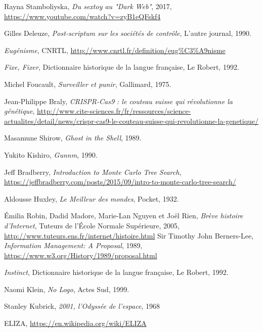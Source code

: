 \begin{thebibliography}{99}
     Rayna Stamboliyska, \emph{Du sextoy au "Dark Web"}, 2017, \url{https://www.youtube.com/watch?v=zyB1eQFskf4}

     Gilles Deleuze, \emph{Post-scriptum sur les sociétés de contrôle}, L'autre journal, 1990.

     \emph{Eugénisme}, CNRTL, \url{http://www.cnrtl.fr/definition/eug%C3%A9nisme}

     \emph{Fixe, Fixer}, Dictionnaire historique de la langue française, Le Robert, 1992. 

     Michel Foucault, \emph{Surveiller et punir}, Gallimard, 1975.

     Jean-Philippe Braly, \emph{CRISPR-Cas9 : le couteau suisse qui révolutionne la génétique}, \url{http://www.cite-sciences.fr/fr/ressources/science-actualites/detail/news/crispr-cas9-le-couteau-suisse-qui-revolutionne-la-genetique/}

     Masamune Shirow, \emph{Ghost in the Shell}, 1989.

     Yukito Kishiro, \emph{Gunnm}, 1990.

     Jeff Bradberry, \emph{Introduction to Monte Carlo Tree Search}, \url{https://jeffbradberry.com/posts/2015/09/intro-to-monte-carlo-tree-search/}

     Aldousse Huxley, \emph{Le Meilleur des mondes}, Pocket, 1932.

     Émilia Robin, Dadid Madore, Marie-Lan Nguyen et Joël Rien, \emph{Brève histoire d'Internet}, Tuteurs de l'École Normale Supérieure, 2005, \url{http://www.tuteurs.ens.fr/internet/histoire.html}
     Sir Timothy John Berners-Lee, \emph{Information Management: A Proposal}, 1989, \url{https://www.w3.org/History/1989/proposal.html}
    
     \emph{Instinct}, Dictionnaire historique de la langue française, Le Robert, 1992. 

     Naomi Klein, \emph{No Logo}, Actes Sud, 1999.

     Stanley Kubrick, \emph{2001, l'Odyssée de l'espace}, 1968

     ELIZA, \url{https://en.wikipedia.org/wiki/ELIZA}


\end{thebibliography}
